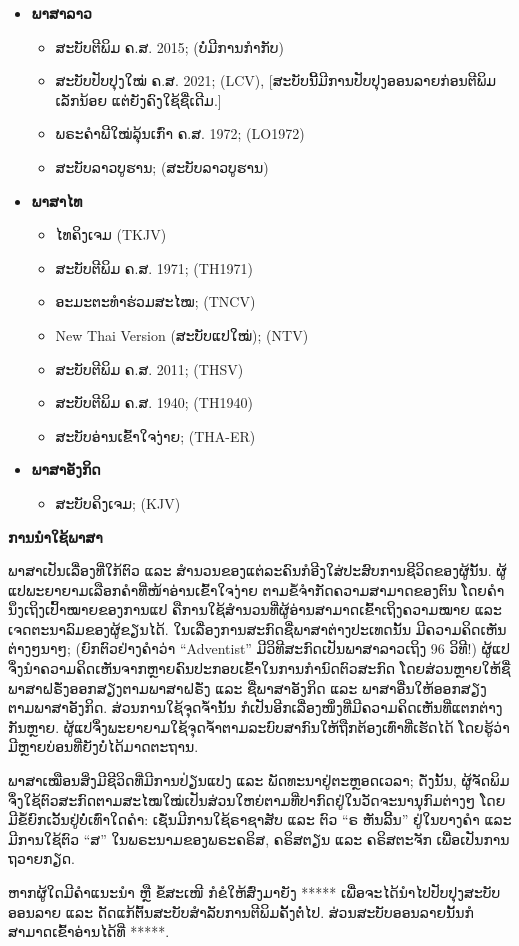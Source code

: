 \begin{itemize}
  \item \textbf{ພາສາລາວ}
  \begin{itemize}
    \item ສະບັບຕີພິມ ຄ.ສ. 2015; (ບໍ່ມີການກຳກັບ)
    \item ສະບັບປັບປຸງໃໝ່ ຄ.ສ. 2021; (LCV), [ສະບັບນີ້ມີການປັບປຸງອອນລາຍກ່ອນຕີພິມເລັກນ້ອຍ ແຕ່ຍັງຄົງໃຊ້ຊື່ເດີມ.]
    \item ພຣະຄຳພີໃໝ່ລຸ້ນເກົ່າ ຄ.ສ. 1972; (LO1972)
    \item ສະບັບລາວບູຮານ; (ສະບັບລາວບູຮານ)
  \end{itemize}

  \item \textbf{ພາສາໄທ}
  \begin{itemize}
    \item ໄທຄິງເຈມ (TKJV)
    \item ສະບັບຕີພິມ ຄ.ສ. 1971; (TH1971)
    \item ອະມະຕະທຳຮ່ວມສະໄໝ; (TNCV)
    \item New Thai Version (ສະບັບແປໃໝ່); (NTV)
    \item ສະບັບຕີພິມ ຄ.ສ. 2011; (THSV)
    \item ສະບັບຕີພິມ ຄ.ສ. 1940; (TH1940)
    \item ສະບັບອ່ານເຂົ້າໃຈງ່າຍ; (THA-ER)
  \end{itemize}
  
  \item  \textbf{ພາສາອັງກິດ}
  \begin{itemize}
    \item ສະບັບຄິງເຈມ; (KJV)
  \end{itemize}
\end{itemize}

\textbf{ການນຳໃຊ້ພາສາ}

ພາສາເປັນເລື່ອງທີ່ໃກ້ຕົວ ແລະ ສຳນວນຂອງແຕ່ລະຄົນກໍອີງໃສ່ປະສົບການຊີວິດຂອງຜູ້ນັ້ນ. ຜູ້ແປພະຍາຍາມເລືອກຄຳທີ່ໜ້າອ່ານເຂົ້າໃຈງ່າຍ ຕາມຂໍ້ຈຳກັດຄວາມສາມາດຂອງຕົນ ໂດຍຄຳນຶງເຖິງເປົ້າໝາຍຂອງການແປ ຄືການໃຊ້ສຳນວນທີ່ຜູ້ອ່ານສາມາດເຂົ້າເຖິງຄວາມໝາຍ ແລະ ເຈດຕະນາລົມຂອງຜູ້ຂຽນໄດ້. ໃນເລື່ອງການສະກົດຊື່ພາສາຕ່າງປະເທດນັ້ນ ມີຄວາມຄິດເຫັນຕ່າງໆນາໆ; (ຍົກຕົວຢ່າງຄຳວ່າ “Adventist” ມີວິທີສະກົດເປັນພາສາລາວເຖິງ 96 ວິທີ!) ຜູ້ແປຈຶ່ງນຳຄວາມຄິດເຫັນຈາກຫຼາຍຄົນປະກອບເຂົ້າໃນການກຳນົດຕົວສະກົດ ໂດຍສ່ວນຫຼາຍໃຫ້ຊື່ພາສາຝຣັ່ງອອກສຽງຕາມພາສາຝຣັ່ງ ແລະ ຊື່ພາສາອັງກິດ ແລະ ພາສາອື່ນໃຫ້ອອກສຽງຕາມພາສາອັງກິດ. ສ່ວນການໃຊ້ຈຸດຈ້ຳນັ້ນ ກໍເປັນອີກເລື່ອງໜຶ່ງທີ່ມີຄວາມຄິດເຫັນທີ່ແຕກຕ່າງກັນຫຼາຍ. ຜູ້ແປຈຶ່ງພະຍາຍາມໃຊ້ຈຸດຈ້ຳຕາມລະບົບສາກົນໃຫ້ຖືກຕ້ອງເທົ່າທີ່ເຮັດໄດ້ ໂດຍຮູ້ວ່າ ມີຫຼາຍບ່ອນທີ່ຍັງບໍ່ໄດ້ມາດຕະຖານ.

ພາສາເໝືອນສິ່ງມີຊີວິດທີ່ມີການປ່ຽນແປງ ແລະ ພັດທະນາຢູ່ຕະຫຼອດເວລາ; ດັ່ງນັ້ນ, ຜູ້ຈັດພິມຈຶ່ງໃຊ້ຕົວສະກົດຕາມສະໄໝໃໝ່ເປັນສ່ວນໃຫຍ່ຕາມທີ່ປາກົດຢູ່ໃນວັດຈະນານຸກົມຕ່າງໆ ໂດຍມີຂໍ້ຍົກເວັ້ນຢູ່ບໍ່ເທົ່າໃດຄຳ: ເຊັ່ນມີການໃຊ້ຣາຊາສັບ ແລະ ຕົວ “ຣ ຫັນລີ້ນ” ຢູ່ໃນບາງຄຳ ແລະ ມີການໃຊ້ຕົວ “ສ” ໃນພຣະນາມຂອງພຣະຄຣິສ, ຄຣິສຕຽນ ແລະ ຄຣິສຕະຈັກ ເພື່ອເປັນການຖວາຍກຽດ.

ຫາກຜູ້ໃດມີຄຳແນະນຳ ຫຼື ຂໍ້ສະເໜີ ກໍຂໍໃຫ້ສົ່ງມາຍັງ ***** ເພື່ອຈະໄດ້ນຳໄປປັບປຸງສະບັບອອນລາຍ ແລະ ດັດແກ້ຕົ້ນສະບັບສຳລັບການຕີພິມຄັ້ງຕໍ່ໄປ. ສ່ວນສະບັບອອນລາຍນັ້ນກໍສາມາດເຂົ້າອ່ານໄດ້ທີ່ *****.

